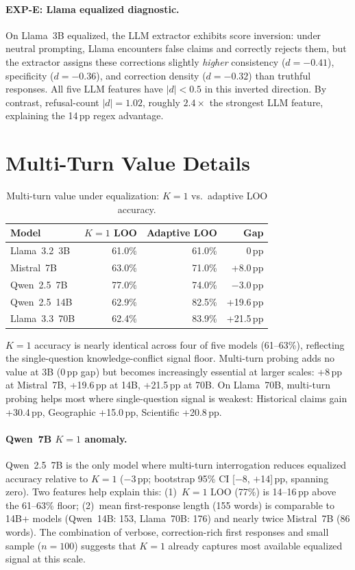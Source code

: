 \paragraph{EXP-E: Llama equalized diagnostic.} On Llama~3B equalized, the LLM extractor exhibits score inversion: under neutral prompting, Llama encounters false claims and correctly rejects them, but the extractor assigns these corrections slightly \emph{higher} consistency ($d=-0.41$), specificity ($d=-0.36$), and correction density ($d=-0.32$) than truthful responses. All five LLM features have $|d|<0.5$ in this inverted direction. By contrast, refusal-count $|d|=1.02$, roughly $2.4\times$ the strongest LLM feature, explaining the 14\,pp regex advantage.

\section{Multi-Turn Value Details}
\label{app:multiturn_details}

\begin{table}[h]
\centering
\caption{Multi-turn value under equalization: $K=1$ vs.\ adaptive LOO accuracy.}
\label{tab:multiturn_equalized}
\begin{tabular}{lrrr}
\toprule
\textbf{Model} & \textbf{$K=1$ LOO} & \textbf{Adaptive LOO} & \textbf{Gap} \\
\midrule
Llama~3.2~3B   & 61.0\% & 61.0\% & 0\,pp \\
Mistral~7B     & 63.0\% & 71.0\% & +8.0\,pp \\
Qwen~2.5~7B    & 77.0\% & 74.0\% & $-$3.0\,pp \\
Qwen~2.5~14B   & 62.9\% & 82.5\% & +19.6\,pp \\
Llama~3.3~70B  & 62.4\% & 83.9\% & +21.5\,pp \\
\bottomrule
\end{tabular}
\end{table}

$K=1$ accuracy is nearly identical across four of five models (61--63\%), reflecting the single-question knowledge-conflict signal floor. Multi-turn probing adds no value at 3B (0\,pp gap) but becomes increasingly essential at larger scales: +8\,pp at Mistral~7B, +19.6\,pp at 14B, +21.5\,pp at 70B. On Llama~70B, multi-turn probing helps most where single-question signal is weakest: Historical claims gain +30.4\,pp, Geographic +15.0\,pp, Scientific +20.8\,pp.

\paragraph{Qwen~7B $K=1$ anomaly.} Qwen~2.5~7B is the only model where multi-turn interrogation reduces equalized accuracy relative to $K=1$ ($-$3\,pp; bootstrap 95\% CI [$-$8, $+$14]\,pp, spanning zero). Two features help explain this: (1)~$K=1$ LOO (77\%) is 14--16\,pp above the 61--63\% floor; (2)~mean first-response length (155 words) is comparable to 14B+ models (Qwen~14B: 153, Llama~70B: 176) and nearly twice Mistral~7B (86 words). The combination of verbose, correction-rich first responses and small sample ($n=100$) suggests that $K=1$ already captures most available equalized signal at this scale.

